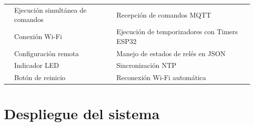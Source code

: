 \begin{table}[H]
\begin{tabular}{p{1.5cm}p{5.4cm}p{5.5cm}}
                                                          & Ejecución simultánea de comandos                                              & Recepción de comandos MQTT                     \\
                                                          & Conexión Wi-Fi                                                                & Ejecución de temporizadores con Timers ESP32   \\
                                                          & Configuración remota                                                          & Manejo de estados de relés en JSON             \\
                                                          & Indicador LED                                                                 & Sincronización NTP                             \\
                                                          & Botón de reinicio                                                             & Reconexión Wi-Fi automática                    \\
        \hline
    \end{tabular}
    \label{tab:nodos_iot}
\end{table}

\section{Despliegue del sistema}

